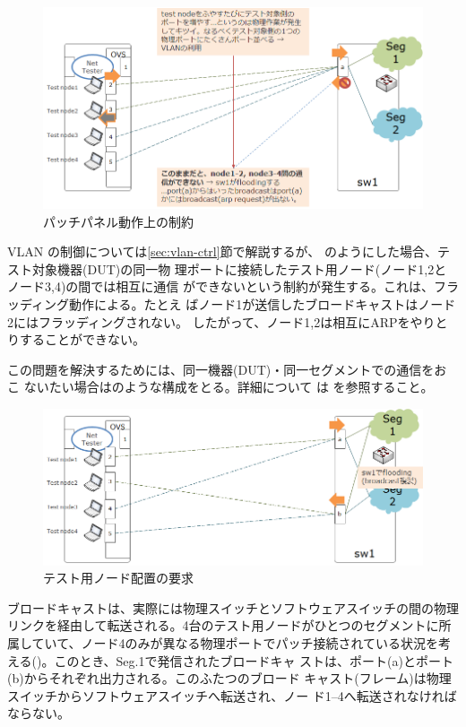\begin{figure}[h]
 \centering
 \includegraphics[scale=0.6]{img/l2bcctrl_req2.png}
 \caption{パッチパネル動作上の制約}
 \label{fig:l2bcctrl_req2}
\end{figure}

VLAN の制御については\ref{sec:vlan-ctrl}節で解説するが、
のようにした場合、テスト対象機器(DUT)の同一物
理ポートに接続したテスト用ノード(ノード1,2とノード3,4)の間では相互に通信
ができないという制約が発生する。これは、フラッディング動作による。たとえ
ばノード1が送信したブロードキャストはノード2にはフラッディングされない。
したがって、ノード1,2は相互にARPをやりとりすることができない。

この問題を解決するためには、同一機器(DUT)・同一セグメントでの通信をおこ
ないたい場合はのような構成をとる。詳細について
は \lopjtech を参照すること。

\begin{figure}[h]
 \centering
 \includegraphics[scale=0.6]{img/l2bcctrl_req3.png}
 \caption{テスト用ノード配置の要求}
 \label{fig:l2bcctrl_req3}
\end{figure}

ブロードキャストは、実際には物理スイッチとソフトウェアスイッチの間の物理
リンクを経由して転送される。4台のテスト用ノードがひとつのセグメントに所
属していて、ノード4のみが異なる物理ポートでパッチ接続されている状況を考
える()。このとき、Seg.1で発信されたブロードキャ
ストは、ポート(a)とポート(b)からそれぞれ出力される。このふたつのブロード
キャスト(フレーム)は物理スイッチからソフトウェアスイッチへ転送され、ノー
ド1--4へ転送されなければならない。

